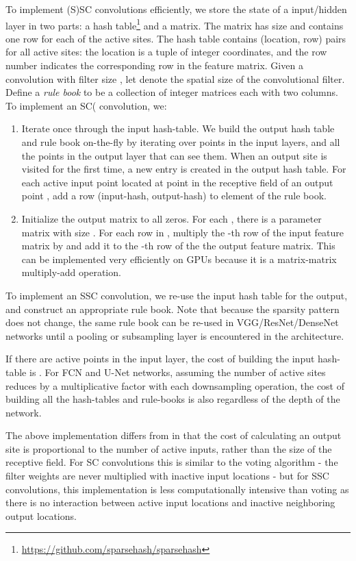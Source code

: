 \documentclass[10pt,twocolumn,letterpaper]{article}
\begin{document}
To implement (S)SC convolutions efficiently, we store the
state of a input/hidden layer in two parts: a hash table\footnote{\url{https://github.com/sparsehash/sparsehash}} and a matrix.
The matrix has size  and contains one row for each of the 
active sites. The hash table contains (location, row) pairs
for all active sites: the location is a tuple of integer coordinates,
and the row number indicates the corresponding row in the feature matrix.
Given a convolution with filter size , let  denote the spatial size of the convolutional filter.
Define a \emph{rule book} to be a collection  of  integer matrices each with two columns.
To implement an SC( convolution, we:

\begin{enumerate}
\item Iterate once through the input hash-table. We build the output hash table and rule book on-the-fly by iterating over
points in the input layers, and all the points in the output layer that can see them.
When an output site is visited for the first time, a new entry is created in the output hash table.
For each active input point  located at point  in the receptive field of an output point , add a row
(input-hash, output-hash) to element  of the rule book.

\item Initialize the output matrix to all zeros. For each , there is a parameter matrix  with
size . For each row  in , multiply the
-th row of the input feature matrix by  and add
it to the -th row of the the output feature matrix. This
can be implemented very efficiently on GPUs because it is a
matrix-matrix multiply-add operation.
\end{enumerate}

To implement an SSC convolution, we re-use the input hash table for the
output, and construct an appropriate rule book. Note that because the sparsity pattern does not change, the same rule book
can be re-used in VGG/ResNet/DenseNet networks until a pooling or subsampling layer is encountered in the architecture.

If there are  active points in the input layer, the cost
of building the input hash-table is . For FCN and U-Net
networks, assuming the number of active sites reduces by a multiplicative
factor with each downsampling operation, the cost of building all the
hash-tables and rule-books is also  regardless of the depth of
the network.

The above implementation differs from \cite{graham2015sparse} in that the cost of calculating an output site is proportional to the number of active inputs, rather than the size of the receptive field. For SC convolutions this is similar to the voting algorithm \cite{wang2015voting,engelcke2017vote3deep} - the filter weights are never multiplied with inactive input locations - but for SSC convolutions, this implementation is less computationally intensive than voting as there is no interaction between active input locations and inactive neighboring output locations.
\end{document}
